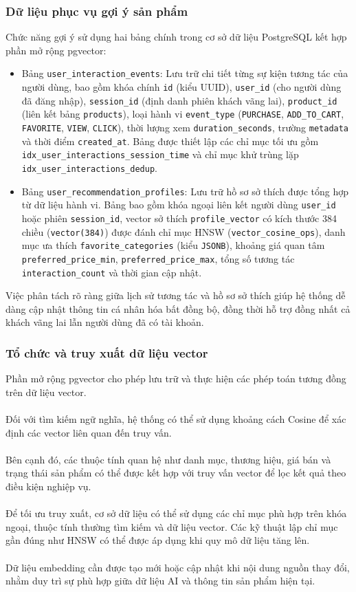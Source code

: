 \documentclass{report}
\begin{document}
\subsubsection{Dữ liệu phục vụ gợi ý sản phẩm}
Chức năng gợi ý sử dụng hai bảng chính trong cơ sở dữ liệu PostgreSQL kết hợp phần mở rộng pgvector:
\begin{itemize}
    \item Bảng \texttt{user\_interaction\_events}: Lưu trữ chi tiết từng sự kiện tương tác của người dùng, bao gồm khóa chính \texttt{id} (kiểu UUID), \texttt{user\_id} (cho người dùng đã đăng nhập), \texttt{session\_id} (định danh phiên khách vãng lai), \texttt{product\_id} (liên kết bảng \texttt{products}), loại hành vi \texttt{event\_type} (\texttt{PURCHASE}, \texttt{ADD\_TO\_CART}, \texttt{FAVORITE}, \texttt{VIEW}, \texttt{CLICK}), thời lượng xem \texttt{duration\_seconds}, trường \texttt{metadata} và thời điểm \texttt{created\_at}. Bảng được thiết lập các chỉ mục tối ưu gồm \texttt{idx\_user\_interactions\_session\_time} và chỉ mục khử trùng lặp \texttt{idx\_user\_interactions\_dedup}.
    \item Bảng \texttt{user\_recommendation\_profiles}: Lưu trữ hồ sơ sở thích được tổng hợp từ dữ liệu hành vi. Bảng bao gồm khóa ngoại liên kết người dùng \texttt{user\_id} hoặc phiên \texttt{session\_id}, vector sở thích \texttt{profile\_vector} có kích thước 384 chiều (\texttt{vector(384)}) được đánh chỉ mục HNSW (\texttt{vector\_cosine\_ops}), danh mục ưa thích \texttt{favorite\_categories} (kiểu \texttt{JSONB}), khoảng giá quan tâm \texttt{preferred\_price\_min}, \texttt{preferred\_price\_max}, tổng số tương tác \texttt{interaction\_count} và thời gian cập nhật.
\end{itemize}
Việc phân tách rõ ràng giữa lịch sử tương tác và hồ sơ sở thích giúp hệ thống dễ dàng cập nhật thông tin cá nhân hóa bất đồng bộ, đồng thời hỗ trợ đồng nhất cả khách vãng lai lẫn người dùng đã có tài khoản.

\subsubsection{Tổ chức và truy xuất dữ liệu vector}
Phần mở rộng pgvector cho phép lưu trữ và thực hiện các phép toán tương đồng trên dữ liệu vector.\\\\
Đối với tìm kiếm ngữ nghĩa, hệ thống có thể sử dụng khoảng cách Cosine để xác định các vector liên quan đến truy vấn.\\\\
Bên cạnh đó, các thuộc tính quan hệ như danh mục, thương hiệu, giá bán và trạng thái sản phẩm có thể được kết hợp với truy vấn vector để lọc kết quả theo điều kiện nghiệp vụ.\\\\
Để tối ưu truy xuất, cơ sở dữ liệu có thể sử dụng các chỉ mục phù hợp trên khóa ngoại, thuộc tính thường tìm kiếm và dữ liệu vector. Các kỹ thuật lập chỉ mục gần đúng như HNSW có thể được áp dụng khi quy mô dữ liệu tăng lên.\\\\
Dữ liệu embedding cần được tạo mới hoặc cập nhật khi nội dung nguồn thay đổi, nhằm duy trì sự phù hợp giữa dữ liệu AI và thông tin sản phẩm hiện tại.
\end{document}

